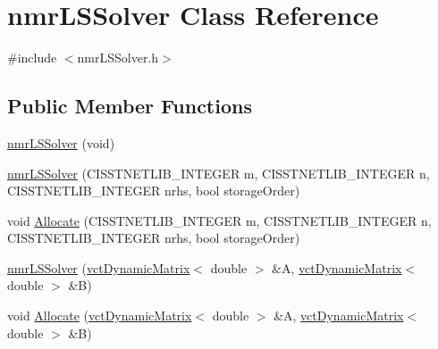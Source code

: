 \hypertarget{classnmr_l_s_solver}{}\section{nmr\+L\+S\+Solver Class Reference}
\label{classnmr_l_s_solver}


{\ttfamily \#include $<$nmr\+L\+S\+Solver.\+h$>$}

\subsection*{Public Member Functions}
\begin{DoxyCompactItemize}
\item 
\hyperlink{classnmr_l_s_solver_a1f0d69b7a362dab5edb72af3ecf00527}{nmr\+L\+S\+Solver} (void)
\item 
\hyperlink{classnmr_l_s_solver_ac462b55b1440d64521aa9e8ee4f4d222}{nmr\+L\+S\+Solver} (C\+I\+S\+S\+T\+N\+E\+T\+L\+I\+B\+\_\+\+I\+N\+T\+E\+G\+E\+R m, C\+I\+S\+S\+T\+N\+E\+T\+L\+I\+B\+\_\+\+I\+N\+T\+E\+G\+E\+R n, C\+I\+S\+S\+T\+N\+E\+T\+L\+I\+B\+\_\+\+I\+N\+T\+E\+G\+E\+R nrhs, bool storage\+Order)
\item 
void \hyperlink{classnmr_l_s_solver_a0ee08c078dcb9256504a06d3c77ac102}{Allocate} (C\+I\+S\+S\+T\+N\+E\+T\+L\+I\+B\+\_\+\+I\+N\+T\+E\+G\+E\+R m, C\+I\+S\+S\+T\+N\+E\+T\+L\+I\+B\+\_\+\+I\+N\+T\+E\+G\+E\+R n, C\+I\+S\+S\+T\+N\+E\+T\+L\+I\+B\+\_\+\+I\+N\+T\+E\+G\+E\+R nrhs, bool storage\+Order)
\end{DoxyCompactItemize}
{\bf }\par
\begin{DoxyCompactItemize}
\item 
\hyperlink{classnmr_l_s_solver_a341c5d3ce07e36febb3ff1136d739638}{nmr\+L\+S\+Solver} (\hyperlink{classvct_dynamic_matrix}{vct\+Dynamic\+Matrix}$<$ double $>$ \&A, \hyperlink{classvct_dynamic_matrix}{vct\+Dynamic\+Matrix}$<$ double $>$ \&B)
\end{DoxyCompactItemize}

{\bf }\par
\begin{DoxyCompactItemize}
\item 
void \hyperlink{classnmr_l_s_solver_a6bde52519284ac538466e6608f78a72d}{Allocate} (\hyperlink{classvct_dynamic_matrix}{vct\+Dynamic\+Matrix}$<$ double $>$ \&A, \hyperlink{classvct_dynamic_matrix}{vct\+Dynamic\+Matrix}$<$ double $>$ \&B)
\end{DoxyCompactItemize}


